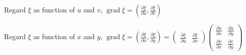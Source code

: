 \begin{example}
    Regard $\xi$ as function of $u$ and $v$, $\operatorname{grad}\xi=\left(\frac{\partial\xi}{\partial u},\frac{\partial\xi}{\partial v}\right)$

    Regard $\xi$ as function of $x$ and $y$, $\operatorname{grad}\xi=\left(\frac{\partial\xi}{\partial x},\frac{\partial\xi}{\partial y}\right)=\begin{pmatrix}
            \frac{\partial\xi}{\partial u} & \frac{\partial\xi}{\partial v}
        \end{pmatrix}\begin{pmatrix}
            \frac{\partial u}{\partial x} & \frac{\partial u}{\partial y} \\
            \frac{\partial v}{\partial x} & \frac{\partial v}{\partial y}
        \end{pmatrix}$
\end{example}

